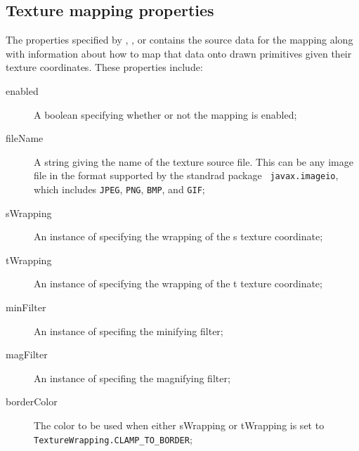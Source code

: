 \subsection{Texture mapping properties}

The properties specified by ,
, or
 contains the source data for the
mapping along with information about how to map that data onto drawn
primitives given their texture coordinates.  These properties include:

\begin{description}

\item[enabled]\mbox{}

A boolean specifying whether or not the mapping is enabled;

\item[fileName]\mbox{}

A string giving the name of the texture source file. This can be
any image file in the format supported by the standrad package {\tt
javax.imageio}, which includes {\tt JPEG}, {\tt PNG}, {\tt BMP}, and
{\tt GIF};

\item[sWrapping]\mbox{} 

An instance of
 specifying
the wrapping of the s texture coordinate;

\item[tWrapping]\mbox{} 

An instance of
 specifying
the wrapping of the t texture coordinate;

\item[minFilter]\mbox{} 

An instance of 
specifing the minifying filter;

\item[magFilter]\mbox{} 

An instance of 
specifing the magnifying filter;

\item[borderColor]\mbox{}

The color to be used when either {\sf sWrapping} or {\sf tWrapping} is
set to {\tt TextureWrapping.CLAMP\_TO\_BORDER};


\end{description}
